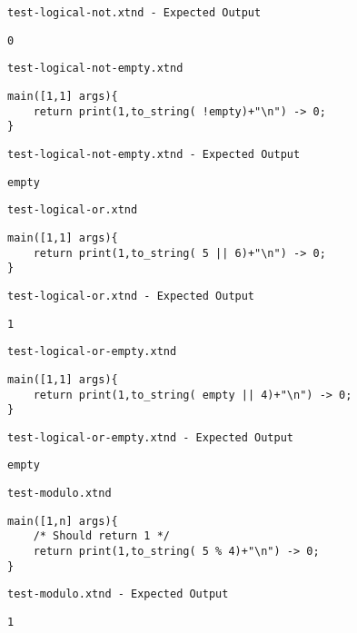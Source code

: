 \medskip \noindent \texttt{test-logical-not.xtnd - Expected Output}


\begin{lstlisting}
0
\end{lstlisting}


\medskip \noindent \texttt{test-logical-not-empty.xtnd}


\begin{lstlisting}
main([1,1] args){
	return print(1,to_string( !empty)+"\n") -> 0;
}
\end{lstlisting}


\medskip \noindent \texttt{test-logical-not-empty.xtnd - Expected Output}


\begin{lstlisting}
empty
\end{lstlisting}


\medskip \noindent \texttt{test-logical-or.xtnd}


\begin{lstlisting}
main([1,1] args){
	return print(1,to_string( 5 || 6)+"\n") -> 0;
}
\end{lstlisting}


\medskip \noindent \texttt{test-logical-or.xtnd - Expected Output}


\begin{lstlisting}
1
\end{lstlisting}


\medskip \noindent \texttt{test-logical-or-empty.xtnd}


\begin{lstlisting}
main([1,1] args){
	return print(1,to_string( empty || 4)+"\n") -> 0;
}
\end{lstlisting}


\medskip \noindent \texttt{test-logical-or-empty.xtnd - Expected Output}


\begin{lstlisting}
empty
\end{lstlisting}


\medskip \noindent \texttt{test-modulo.xtnd}


\begin{lstlisting}
main([1,n] args){
	/* Should return 1 */
	return print(1,to_string( 5 % 4)+"\n") -> 0;
}
\end{lstlisting}


\medskip \noindent \texttt{test-modulo.xtnd - Expected Output}


\begin{lstlisting}
1
\end{lstlisting}


